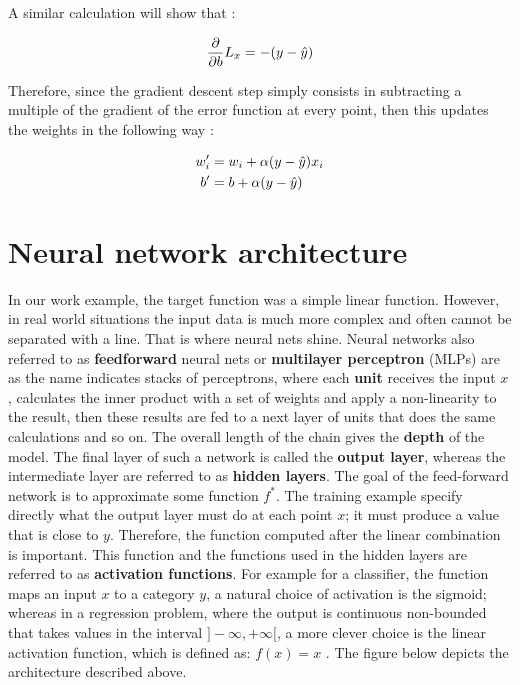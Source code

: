 A similar calculation will show that :

$$
\frac{\partial}{\partial b} L_x = -(y - \hat{y})
$$

Therefore, since the gradient descent step simply consists in subtracting a multiple of the gradient of the error function at every point, then this updates the weights in the following way \cite{ud188}:

\begin{align}
  \label{equ:gradient_update_rule}
  w^{\prime}_i &= w_i + \alpha (y - \hat{y})x_i \\
  b^{\prime} &= b + \alpha (y - \hat{y})
\end{align}

\section{Neural network architecture}
In our work example, the target function was a simple linear function. However, in real world situations the input data is much more complex and often cannot be separated with a line. That is where neural nets shine. Neural networks also referred to as \textbf{feedforward} neural nets or \textbf{multilayer perceptron} (MLPs) are as the name indicates stacks of perceptrons, where each \textbf{unit} receives the input $x$, calculates the inner product with a set of weights and apply a non-linearity to the result, then these results are fed to a next layer of units that does the same calculations and so on. The overall length of the chain gives the \textbf{depth} of the model. The final layer of such a network is called the \textbf{output layer}, whereas the intermediate layer are referred to as \textbf{hidden layers}. The goal of the feed-forward network is to approximate some function $f^*$. The training example specify directly what the output layer must do at each point $x$; it must produce a value that is close to $y$. Therefore, the function computed after the linear combination is important. This function and the functions used in the hidden layers are referred to as \textbf{activation functions}. For example for a classifier, the function maps an input $x$ to a category $y$, a natural choice of activation is the sigmoid; whereas in a regression problem, where the output is continuous non-bounded that takes values in the interval $]-\infty, +\infty[$, a more clever choice is the linear activation function, which is defined as: $f(x) = x$ \cite{Ian16}.
The figure below depicts the architecture described above.

